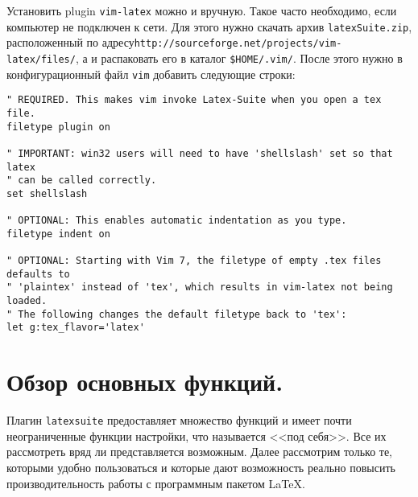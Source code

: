 \documentclass[a4paper]{article}
\begin{document}
Установить plugin \texttt{vim-latex} можно и вручную. Такое часто необходимо, 
если компьютер не подключен к сети. Для этого нужно скачать архив 
\texttt{latexSuite.zip}, расположенный по адресу\linebreak \texttt{http://sourceforge.net/projects/vim-latex/files/},
а и распаковать его в каталог \verb|$HOME/.vim/|. После этого нужно в 
конфигурационный файл \texttt{vim} добавить следующие строки:
\begin{verbatim}
" REQUIRED. This makes vim invoke Latex-Suite when you open a tex file.
filetype plugin on

" IMPORTANT: win32 users will need to have 'shellslash' set so that latex
" can be called correctly.
set shellslash

" OPTIONAL: This enables automatic indentation as you type.
filetype indent on

" OPTIONAL: Starting with Vim 7, the filetype of empty .tex files defaults to
" 'plaintex' instead of 'tex', which results in vim-latex not being loaded.
" The following changes the default filetype back to 'tex':
let g:tex_flavor='latex'
\end{verbatim}

\part{Обзор основных функций.}
Плагин \texttt{latexsuite} предоставляет множество функций и имеет почти
неограниченные функции настройки, что называется <<под себя>>. Все их
рассмотреть вряд ли представляется возможным. Далее рассмотрим только те,
которыми удобно пользоваться и которые дают возможность реально 
повысить производительность работы с программным пакетом \LaTeX.
\end{document}
